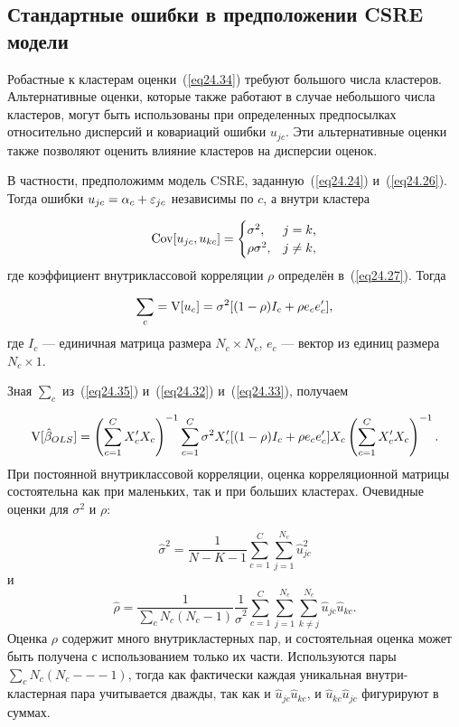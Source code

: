 \subsection*{Стандартные ошибки в предположении CSRE модели}

Робастные к кластерам оценки~(\ref{eq24.34}) требуют большого числа кластеров. Альтернативные оценки, которые также работают в случае небольшого числа кластеров, могут быть использованы при определенных предпосылках относительно дисперсий и ковариаций ошибки $u_{jc}$. Эти альтернативные оценки также позволяют оценить влияние кластеров на дисперсии оценок. 

В частности, предположимм модель CSRE, заданную~(\ref{eq24.24}) и~(\ref{eq24.26}). Тогда ошибки $u_{jc} = \alpha_c + \varepsilon_{jc}$ независимы по $c$, а внутри кластера

$$
\mathrm{Cov}[u_{jc}, u_{kc}]=\begin{cases}
\sigma^2,&\text{$j = k$,}\\
\rho\sigma^2,&\text{$j \ne k$,}
\end{cases}
$$
где коэффициент внутриклассовой корреляции $\rho$ определён в~(\ref{eq24.27}). Тогда

\begin{equation}
\label{eq24.35}
\sum_c = \mathrm{V}[u_c] = \sigma^2 [(1-\rho) I_c + \rho e_c e'_c],
\end{equation}
где $I_c$ --- единичная матрица размера $N_c \times N_c$, $e_c$ --- вектор из единиц размера $N_c \times 1$. 

Зная $\sum_c$  из~(\ref{eq24.35}) и~(\ref{eq24.32}) и~(\ref{eq24.33}), получаем

\begin{equation}
\label{eq24.36}
\mathrm{V}[\hat \beta_{OLS}] = \left( \sum_{c=1}^C X'_c X_c \right)^{-1} \sum_{c=1}^C \sigma^2 X'_c [(1-\rho) I_c + \rho e_c e'_c] X_c \left( \sum_{c=1}^C X'_c X_c \right)^{-1}.
\end{equation}
При постоянной внутриклассовой корреляции, оценка корреляционной матрицы состоятельна как при маленьких, так и при больших кластерах. Очевидные оценки для $\sigma ^2$ и $\rho$:

$$
\hat \sigma^2 = \frac{1}{N-K-1} \sum_{c=1}^C \sum_{j=1}^{N_c} \hat u^2_{jc}
$$
и
$$
\hat \rho = \frac{1}{\sum_c N_c (N_c -1)} \frac{1}{\hat \sigma^2} \sum_{c=1}^C \sum_{j=1}^{N_c} \sum_{k \ne j}^{N_c} \hat u_{jc} \hat u_{kc}.
$$
Оценка $\rho$ содержит много внутрикластерных пар, и состоятельная оценка может быть получена с использованием только их части. Используются пары $\sum_c N_c(N_c --- 1)$, тогда как фактически каждая уникальная внутри-кластерная пара учитывается дважды, так как и $\hat u_{jc} \hat u_{kc}$, и $\hat u_{kc} \hat u_{jc}$ фигурируют в суммах. 

